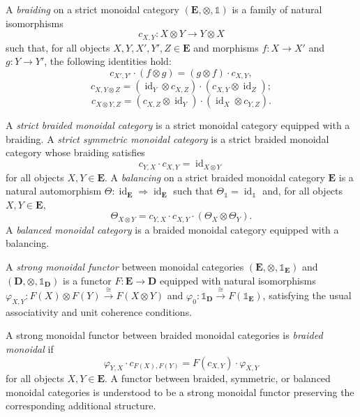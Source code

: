 \documentclass{amsart}
\newcommand{\bE}{\mathbf{E}}
\newcommand{\id}{\operatorname{id}}
\theoremstyle{definition}
\numberwithin{equation}{section}
\begin{document}
A \emph{braiding} on a strict monoidal category
$(\bE,\otimes,\mathbb{1})$ is a family of natural isomorphisms
\[
c_{X,Y}\colon X\otimes Y \longrightarrow Y\otimes X
\]
such that, for all objects $X,Y,X',Y',Z\in\bE$ and morphisms
$f\colon X\to X'$ and $g\colon Y\to Y'$, the following identities hold:
\begin{equation}
\label{eq:naturality}
c_{X',Y'}\cdot(f\otimes g)
=
(g\otimes f)\cdot c_{X,Y},
\end{equation}
\begin{equation}
\label{eq:hexagon1}
c_{X,Y\otimes Z}
=
(\id_Y\otimes c_{X,Z})
\cdot
(c_{X,Y}\otimes\id_Z);
\end{equation}
\begin{equation}
\label{eq:hexagon2}
c_{X\otimes Y,Z}
=
(c_{X,Z}\otimes\id_Y)
\cdot
(\id_X\otimes c_{Y,Z}).
\end{equation}

A \emph{strict braided monoidal category} is a strict monoidal category
equipped with a braiding. A \emph{strict symmetric monoidal category}
is a strict braided monoidal category whose braiding satisfies
\[
c_{Y,X}\cdot c_{X,Y}=\id_{X\otimes Y}
\]
for all objects $X,Y\in\bE$.
A \emph{balancing} on a strict braided monoidal category $\bE$ is a natural automorphism $\Theta\colon\id_{\bE}\Rightarrow\id_{\bE}$ such that $\Theta_{\mathbb{1}}=\id_{\mathbb{1}}$ and, for all objects $X,Y\in\bE$,
\begin{equation}
\label{eq:balancing}
\Theta_{X\otimes Y}
=
c_{Y,X}\cdot c_{X,Y}\cdot(\Theta_X\otimes\Theta_Y).
\end{equation}
A \emph{balanced monoidal category} is a braided monoidal category equipped with a balancing.

A \emph{strong monoidal functor} between monoidal categories $(\bE,\otimes,\mathbb{1}_{\bE})$ and $(\mathbf{D},\otimes,\mathbb{1}_{\mathbf{D}})$ is a functor $F\colon\bE\to\mathbf{D}$ equipped with natural isomorphisms
$\varphi_{X,Y}\colon F(X)\otimes F(Y)\xrightarrow{\cong}F(X\otimes Y)$ and
$\varphi_0\colon\mathbb{1}_{\mathbf{D}}\xrightarrow{\cong}F(\mathbb{1}_{\bE})$,
satisfying the usual associativity and unit coherence conditions.

A strong monoidal functor between braided monoidal categories is \emph{braided monoidal} if
\[
\varphi_{Y,X}\cdot c_{F(X),F(Y)}
=
F(c_{X,Y})\cdot\varphi_{X,Y}
\]
for all objects $X,Y\in\bE$. A functor between braided, symmetric, or balanced monoidal categories is understood to be a strong monoidal functor preserving the corresponding additional structure.
\end{document}
